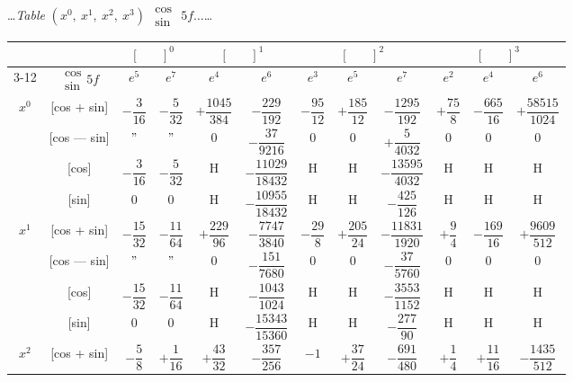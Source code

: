 \documentclass[10pt,a4paper]{article}
\newcommand{\tabletitle}[2]{%
  \begin{center}
  \ldots\textit{Table} #1 $\displaystyle\begin{smallmatrix} \cos \\ \sin \end{smallmatrix}$ #2\ldots
  \end{center}
}
\begin{document}
\vspace{1em}

\newpage
\tabletitle{$(x^0,\ x^1,\ x^2,\ x^3)$}{$5f\ldots$}

\begin{center}
\small
\begin{tabular}{|c|c|c|c|c|c|c|c|c|c|c|c|}
\hline
& & \multicolumn{2}{c|}{$[\phantom{()}]^0$} & \multicolumn{2}{c|}{$[\phantom{()}]^1$} & \multicolumn{3}{c|}{$[\phantom{()}]^2$} & \multicolumn{3}{c|}{$[\phantom{()}]^3$} \\
\cline{3-12}
& $\begin{smallmatrix} \cos \\ \sin \end{smallmatrix} 5f$ & $e^5$ & $e^7$ & $e^4$ & $e^6$ & $e^3$ & $e^5$ & $e^7$ & $e^2$ & $e^4$ & $e^6$ \\
\hline
\multirow{4}{*}{$x^0$} & [cos + sin] & $-\dfrac{3}{16}$ & $-\dfrac{5}{32}$ & $+\dfrac{1045}{384}$ & $-\dfrac{229}{192}$ & $-\dfrac{95}{12}$ & $+\dfrac{185}{12}$ & $-\dfrac{1295}{192}$ & $+\dfrac{75}{8}$ & $-\dfrac{665}{16}$ & $+\dfrac{58515}{1024}$ \\
& [cos --- sin] & $"$ & $"$ & $0$ & $-\dfrac{37}{9216}$ & $0$ & $0$ & $+\dfrac{5}{4032}$ & $0$ & $0$ & $0$ \\
& [cos] & $-\dfrac{3}{16}$ & $-\dfrac{5}{32}$ & H & $-\dfrac{11029}{18432}$ & H & H & $-\dfrac{13595}{4032}$ & H & H & H \\
& [sin] & $0$ & $0$ & H & $-\dfrac{10955}{18432}$ & H & H & $-\dfrac{425}{126}$ & H & H & H \\
\hline
\multirow{4}{*}{$x^1$} & [cos + sin] & $-\dfrac{15}{32}$ & $-\dfrac{11}{64}$ & $+\dfrac{229}{96}$ & $-\dfrac{7747}{3840}$ & $-\dfrac{29}{8}$ & $+\dfrac{205}{24}$ & $-\dfrac{11831}{1920}$ & $+\dfrac{9}{4}$ & $-\dfrac{169}{16}$ & $+\dfrac{9609}{512}$ \\
& [cos --- sin] & $"$ & $"$ & $0$ & $-\dfrac{151}{7680}$ & $0$ & $0$ & $-\dfrac{37}{5760}$ & $0$ & $0$ & $0$ \\
& [cos] & $-\dfrac{15}{32}$ & $-\dfrac{11}{64}$ & H & $-\dfrac{1043}{1024}$ & H & H & $-\dfrac{3553}{1152}$ & H & H & H \\
& [sin] & $0$ & $0$ & H & $-\dfrac{15343}{15360}$ & H & H & $-\dfrac{277}{90}$ & H & H & H \\
\hline
\multirow{4}{*}{$x^2$} & [cos + sin] & $-\dfrac{5}{8}$ & $+\dfrac{1}{16}$ & $+\dfrac{43}{32}$ & $-\dfrac{357}{256}$ & $-1$ & $+\dfrac{37}{24}$ & $-\dfrac{691}{480}$ & $+\dfrac{1}{4}$ & $+\dfrac{11}{16}$ & $-\dfrac{1435}{512}$ \\

\end{tabular}
\end{center}
\end{document}
